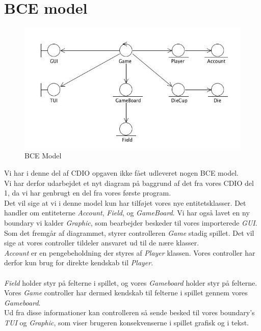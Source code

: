 \section{BCE model}
\begin{figure}[ht]
\centering
\includegraphics[scale=0.5]{BCE.jpg}
\caption[<Text for the list of figures>]{BCE Model}
\label{fig:figure 2}
\end{figure}
Vi har i denne del af CDIO opgaven ikke fået udleveret nogen BCE model.
\\
Vi har derfor udarbejdet et nyt diagram på baggrund af det fra vores CDIO del 1, da vi har genbrugt en del fra vores første program.
\\
Det vil sige at vi i denne model kun har tilføjet vores nye entitetsklasser. Det handler om entiteterne \textit{Account}, \textit{Field}, og \textit{GameBoard}. Vi har også lavet en ny boundary vi kalder \textit{Graphic}, som bearbejder beskeder til vores importerede \textit{GUI}.
\\
Som det fremgår af diagrammet, styrer controlleren \textit{Game} stadig spillet. Det vil sige at vores controller tildeler ansvaret ud til de nære klasser.
\\
\textit{Account} er en pengebeholdning der styres af \textit{Player} klassen. Vores controller har derfor kun brug for direkte kendskab til \textit{Player}.
\\\\
\textit{Field} holder styr på felterne i spillet, og vores \textit{Gameboard} holder styr på felterne. Vores \textit{Game} controller har dermed kendskab til felterne i spillet gennem vores \textit{Gameboard}.
\\


Ud fra disse informationer kan controlleren så sende besked til vores boundary's \textit{TUI} og \textit{Graphic}, som viser brugeren konsekvenserne i spillet grafisk og i tekst.